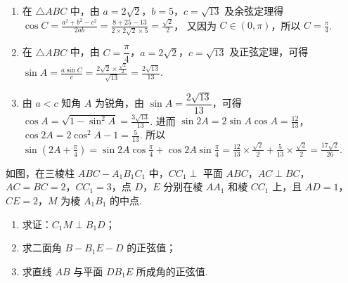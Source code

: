 \begin{solution}
\begin{enumerate}
\item 在 \( \triangle ABC \) 中，由 \( a=2\sqrt2 \)，\( b=5 \)，\( c=\sqrt{13} \) 及余弦定理得
\(\cos C=\frac{a^2+b^2-c^2}{2ab} =\frac{8+25-13}{2\times2\sqrt2\times5} =\frac{\sqrt2}{2}\)，
又因为 \( C\in\left( 0,\pi \right) \)，所以
\(C=\frac{\pi}{4}\).

\item 在 \( \triangle ABC \) 中，由 \( C=\dfrac{\pi}{4} \)，\( a=2\sqrt2 \)，\( c=\sqrt{13} \) 及正弦定理，可得
\(\sin A=\frac{a\sin C}{c} =\frac{2\sqrt2\times\frac{\sqrt2}{2}}{\sqrt{13}} =\frac{2\sqrt{13}}{13}\).

\item 由 \( a<c \) 知角 \(A\) 为锐角，由 \( \sin A=\dfrac{2\sqrt{13}}{13} \)，可得
\(\cos A=\sqrt{1-\sin^2 A}=\frac{3\sqrt{13}}{13}\).
进而
\(\sin2A=2\sin A\cos A=\frac{12}{13}\)，\(\cos2A=2\cos^2 A-1=\frac{5}{13}\).
所以
\(\sin\left( 2A+\frac{\pi}{4} \right)
=\sin2A\cos\frac{\pi}{4}+\cos2A\sin\frac{\pi}{4}
=\frac{12}{13}\times\frac{\sqrt2}{2}+\frac{5}{13}\times\frac{\sqrt2}{2}
=\frac{17\sqrt2}{26}\).
\end{enumerate}
\end{solution}

\begin{problem}
如图，在三棱柱 \(ABC-A_1B_1C_1\) 中，\(CC_1\perp\) 平面 \(ABC\)，\(AC\perp BC\)，\(AC=BC=2\)，\(CC_1=3\)，点 \(D\)，\(E\) 分别在棱 \(AA_1\) 和棱 \(CC_1\) 上，且 \(AD=1\)，\(CE=2\)，\(M\) 为棱 \(A_1B_1\) 的中点.



\begin{enumerate}
\item 求证：\(C_1M\perp B_1D\)；
\item 求二面角 \(B-B_1E-D\) 的正弦值；
\item 求直线 \(AB\) 与平面 \(DB_1E\) 所成角的正弦值.
\end{enumerate}

\end{problem}


